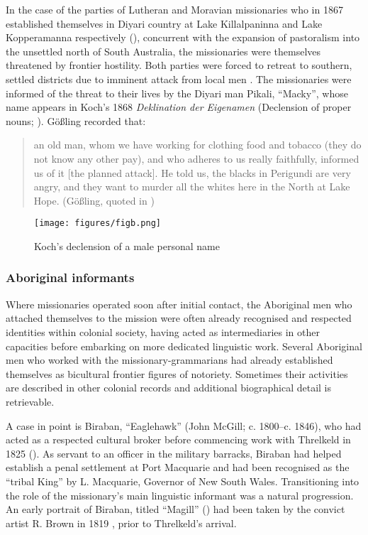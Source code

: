 In the case of the parties of Lutheran and Moravian missionaries who in 1867 established themselves in Diyari country at Lake Killalpaninna and Lake Kopperamanna respectively (), concurrent with the expansion of pastoralism into the unsettled north of South Australia, the missionaries were themselves threatened by frontier hostility. Both parties were forced to retreat to southern, settled districts due to imminent attack from local men \citep[72--83]{proeve_work_1952}. The missionaries were informed of the threat to their lives by the Diyari man Pikali, “Macky”, whose name appears in Koch’s 1868 \textit{Deklination der Eigenamen} (Declension of proper nouns; ). Gößling recorded that: 

\begin{quote}
    an old man, whom we have working for clothing food and tobacco (they do not know any other pay), and who adheres to us really faithfully, informed us of it [the planned attack]. He told us, the blacks in Perigundi are very angry, and they want to murder all the whites here in the North at Lake Hope. (Gößling, quoted in \citealt[72--83]{proeve_work_1952})
\end{quote}

\begin{figure}
\texttt{[image: figures/figb.png]}
\caption{Koch’s declension of a male personal name \citep[no pag.]{koch_untitled_1868}}
\label{fig:key:1.1.3-2}
\end{figure} 

\subsubsection{Aboriginal informants}
\label{sec:key:1.1.3.2}

Where missionaries operated soon after initial contact, the Aboriginal men who attached themselves to the mission were often already recognised and respected identities within colonial society, having acted as intermediaries in other capacities before embarking on more dedicated linguistic work. Several Aboriginal men who worked with the missionary-grammarians had already established themselves as bicultural frontier figures of notoriety. Sometimes their activities are described in other colonial records and additional biographical detail is retrievable.

A case in point is Biraban, “Eaglehawk” (John McGill; c. 1800--c. 1846), who had acted as a respected cultural broker before commencing work with Threlkeld in 1825 (). As servant to an officer in the military barracks, Biraban had helped establish a penal settlement at Port Macquarie and had been recognised as the “tribal King” by L. Macquarie, Governor of New South Wales. Transitioning into the role of the missionary’s main linguistic informant was a natural progression. An early portrait of Biraban, titled “Magill” () had been taken by the convict artist R. Brown in 1819 \citep{Gunson2021}, prior to Threlkeld’s arrival.

